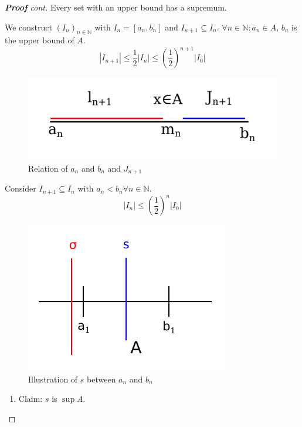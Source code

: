 \documentclass[a4paper,landscape,twocolumn]{article}
\theoremstyle{definition}
\newcommand\abs[1]{\left|#1\right|}
\begin{document}
\begin{proof}[\textbf{Proof} cont]
  Every set with an upper bound has a supremum.

  We construct $(I_n)_{n \in \mathbb N}$ with $I_n = [a_n, b_n]$ and $I_{n+1} \subseteq I_n$.
  $\forall n \in \mathbb N: a_n \in A$, $b_n$ is the upper bound of $A$.
  \[ \abs{I_{n+1}} \leq \frac12 \abs{I_n} \leq \left(\frac12\right)^{n+1} \abs{I_0} \]

  \begin{figure}[!h]
    \begin{center}
      \includegraphics{img/proof_interval.pdf}
      \caption[width=200pt]{Relation of $a_n$ and $b_n$ and $J_{n+1}$}
    \end{center}
  \end{figure}

  Consider $I_{n+1} \subseteq I_n$ with $a_n < b_n \forall n \in \mathbb N$.
  \[ \abs{I_n} \leq \left(\frac12\right)^n \abs{I_0} \]

  \begin{figure}[!h]
    \begin{center}
      \includegraphics{img/proof_interval2.pdf}
      \caption[width=200pt]{Illustration of $s$ between $a_n$ and $b_n$}
    \end{center}
  \end{figure}

  \begin{enumerate}
    \item
      Claim: $s$ is $\sup{A}$.


\end{enumerate}
\end{proof}
\end{document}
